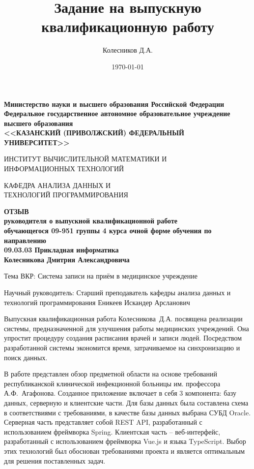 \documentclass[a4paper,article]{article}
\author{Колесников Д.А.}
\title{Задание на выпускную квалификационную работу}
\date{\today}
\begin{document}
\begin{sloppypar}
    \begin{center}
        \textbf{Министерство науки и высшего образования Российской Федерации \\
        Федеральное государственное автономное образовательное учреждение \\
        высшего образования\\
        <<КАЗАНСКИЙ (ПРИВОЛЖСКИЙ) ФЕДЕРАЛЬНЫЙ УНИВЕРСИТЕТ>>} \\
    \end{center}
    
    \begin{center}
        ИНСТИТУТ ВЫЧИСЛИТЕЛЬНОЙ МАТЕМАТИКИ И \\
        ИНФОРМАЦИОННЫХ ТЕХНОЛОГИЙ
    \end{center}
    
    \begin{center}
        КАФЕДРА АНАЛИЗА ДАННЫХ И \\
        ТЕХНОЛОГИЙ ПРОГРАММИРОВАНИЯ
    \end{center}

    \begin{center}
        \textbf{ОТЗЫВ \\
        руководителя о выпускной квалификационной работе \\
        обучающегося 09-951 группы 4 курса очной форме обучения по направлению  \\
        09.03.03 Прикладная информатика \\
        Колесникова Дмитрия Александровича} \\
    \end{center}

    Тема ВКР: Система записи на приём в медицинское учреждение
    
    Научный руководитель: Старший преподаватель кафедры анализа данных и технологий программирования Еникеев Искандер Арсланович \newline
    
    Выпускная квалификационная работа Колесникова~Д.А. посвящена реализации системы, предназначенной для улучшения работы медицинских учреждений. Она упростит процедуру создания расписания врачей и записи людей. Посредством разработанной системы экономится время, затрачиваемое на синхронизацию и поиск данных.
    
    В работе представлен обзор предметной области на основе требований республиканской клинической инфекционной больницы им. профессора А.Ф.~Агафонова. Созданное приложение включает в себя 3 компонента: базу данных, серверную и клиентские части. Для базы данных была составлена схема в соответствиями с требованиями, в качестве базы данных выбрана СУБД Oracle. Серверная часть представляет собой REST API, разработанный с использованием фреймворка Spring. Клиентская часть -- веб-интерфейс, разработанный с использованием фреймворка Vue.js и языка TypeScript.  Выбор этих технологий был обоснован требованиями проекта и является оптимальным для решения поставленных задач.
    

\end{sloppypar}
\end{document}
